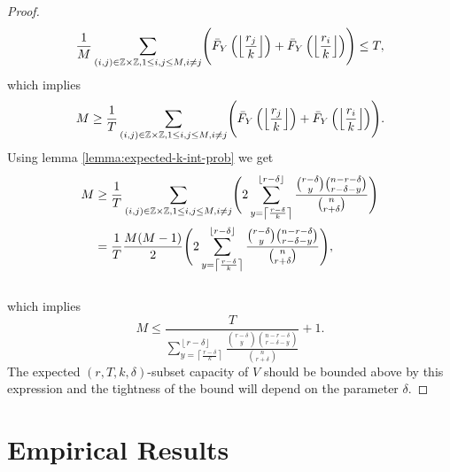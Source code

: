 \begin{proof}
\begin{equation*}
      \frac{1}{M} \sum_{(i,j) \in \mathbb{Z}\times\mathbb{Z}, 1 \le i,j \le M, i \ne j}  \Biggl( \bar{F}_Y\left(\left\lfloor \frac{r_j}{k} \right\rfloor\right) + \bar{F}_Y\left(\left\lfloor \frac{r_i}{k} \right\rfloor\right) \Biggr)  \le T,
\end{equation*}
\noindent which implies
\begin{equation}
\label{equ:cap-r}      
       M \geq \frac{1}{T}\sum_{(i,j) \in \mathbb{Z}\times\mathbb{Z}, 1 \le i,j \le M, i \ne j}  \Biggl( \bar{F}_Y\left(\left\lfloor \frac{r_j}{k} \right\rfloor\right) + \bar{F}_Y\left(\left\lfloor \frac{r_i}{k} \right\rfloor\right)\Biggr). 
\end{equation}
Using lemma \ref{lemma:expected-k-int-prob} we get
\begin{equation}
\label{equ:cap-r-2}
    \begin{split}
           M &\ge
           \frac{1}{T}\sum_{(i,j) \in \mathbb{Z}\times\mathbb{Z}, 1 \le i,j \le M, i \ne j}  \Biggl( 2 \sum_{y = \left\lceil \frac{r-\delta}{k} \right\rceil}^{\left\lfloor r - \delta \right\rfloor} \frac{\binom{r-\delta}{y} \binom{n-r-\delta}{r-\delta-y}}{\binom{n}{r+\delta}}\Biggr) \\
           &=\frac{1}{T} \frac{M(M-1)}{2} \Biggl( 2 \sum_{y = \left\lceil \frac{r-\delta}{k} \right\rceil}^{\left\lfloor r - \delta \right\rfloor} \frac{\binom{r-\delta}{y} \binom{n-r-\delta}{r-\delta-y}}{\binom{n}{r+\delta}}\Biggr),
    \end{split}
    \end{equation} \\
\noindent which implies 
\begin{equation}
    \label{equ:cap-r-bounded}     
    M \le \frac{T}{\sum_{y = \left\lceil \frac{r-\delta}{k} \right\rceil}^{\left\lfloor r - \delta \right\rfloor} \frac{\binom{r-\delta}{y} \binom{n-r-\delta}{r-\delta-y}}{\binom{n}{r+\delta}}} + 1.
\end{equation}
The expected $(r,T,k,\delta)$-subset capacity of $V$ should be bounded above by this expression and the tightness of the bound will depend on the parameter $\delta$. 
\end{proof}

\section{Empirical Results}












